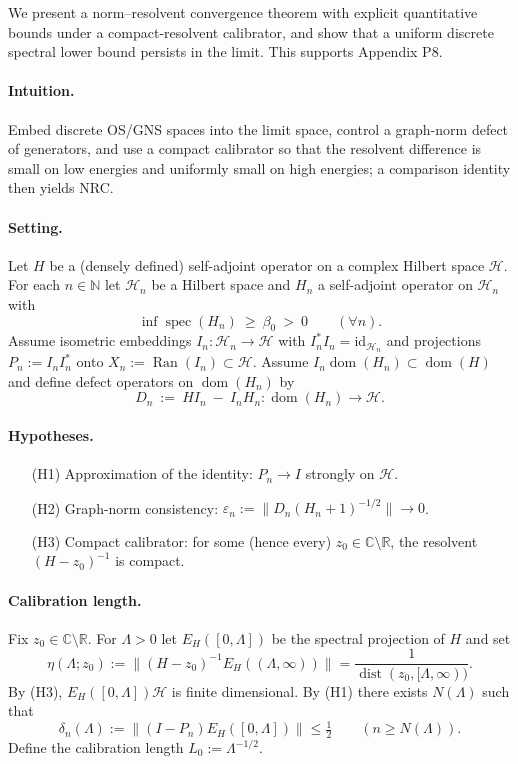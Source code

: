 \documentclass[11pt]{amsart}
\begin{document}
We present a norm–resolvent convergence theorem with explicit quantitative bounds under a compact-resolvent calibrator, and show that a uniform discrete spectral lower bound persists in the limit. This supports Appendix P8.

\paragraph{Intuition.} Embed discrete OS/GNS spaces into the limit space, control a graph-norm defect of generators, and use a compact calibrator so that the resolvent difference is small on low energies and uniformly small on high energies; a comparison identity then yields NRC.

\paragraph{Setting.}
Let $H$ be a (densely defined) self-adjoint operator on a complex Hilbert space $\mathcal H$. For each $n\in\mathbb N$ let $\mathcal H_n$ be a Hilbert space and $H_n$ a self-adjoint operator on $\mathcal H_n$ with
\[
  \inf\operatorname{spec}(H_n)\ \ge\ \beta_0\ >\ 0\qquad(\forall n).
\]
Assume isometric embeddings $I_n:\mathcal H_n\to\mathcal H$ with $I_n^*I_n=\mathrm{id}_{\mathcal H_n}$ and projections $P_n:=I_n I_n^*$ onto $X_n:=\operatorname{Ran}(I_n)\subset\mathcal H$. Assume $I_n\operatorname{dom}(H_n)\subset\operatorname{dom}(H)$ and define defect operators on $\operatorname{dom}(H_n)$ by
\[
  D_n\ :=\ H I_n\ -\ I_n H_n: \operatorname{dom}(H_n)\to\mathcal H.
\]

\paragraph{Hypotheses.}
\begin{itemize}
  \item[(H1)] Approximation of the identity: $P_n\to I$ strongly on $\mathcal H$.
  \item[(H2)] Graph-norm consistency: $\varepsilon_n:=\bigl\| D_n (H_n+1)^{-1/2}\bigr\|\to 0$.
  \item[(H3)] Compact calibrator: for some (hence every) $z_0\in\mathbb C\setminus\mathbb R$, the resolvent $(H-z_0)^{-1}$ is compact.
\end{itemize}

\paragraph{Calibration length.}
Fix $z_0\in\mathbb C\setminus\mathbb R$. For $\Lambda>0$ let $E_H([0,\Lambda])$ be the spectral projection of $H$ and set
\[
  \eta(\Lambda;z_0):=\bigl\|(H-z_0)^{-1} E_H((\Lambda,\infty))\bigr\|=\frac{1}{\operatorname{dist}(z_0,[\Lambda,\infty))}.
\]
By (H3), $E_H([0,\Lambda])\mathcal H$ is finite dimensional. By (H1) there exists $N(\Lambda)$ such that
\[
  \delta_n(\Lambda):=\bigl\|(I-P_n) E_H([0,\Lambda])\bigr\|\le \tfrac12\qquad(n\ge N(\Lambda)).
\]
Define the calibration length $L_0:=\Lambda^{-1/2}$.
\end{document}
